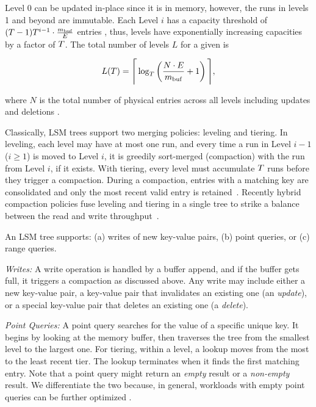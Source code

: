 Level 0 can be updated in-place since it is in memory, however, the runs in
levels 1 and beyond are immutable. Each Level $i$ has a capacity threshold of
$({{T}} - 1) T^{i-1} \cdot \frac{{{m_{\mathrm{buf}}}}}{E}$ entries , thus, levels have
exponentially increasing capacities by a factor of ${{T}}$.  The total
number of levels $L$ for a given {\sizeratio} is 

\begin{equation} 
L(T) = \Bigg\lceil \log_T \left( {\frac{N \cdot E}{{{m_{\mathrm{buf}}}}}} + 1 \right) \Bigg\rceil ,
\label{eq:levels}
\end{equation}

where $N$ is the total number of physical entries across all levels including
updates and deletions \cite{Dayan2018a, Luo2020, Sarkar2020}. 


Classically, LSM trees support two merging policies: leveling and tiering. 
In leveling, each level may have at most one run, and every time a run in Level
    $i - 1$ ($i \geq 1$) is moved to Level $i$, it is greedily sort-merged
    (compaction) with the run from Level $i$, if it exists. 
With tiering, every level must accumulate ${{T}}$ runs before they trigger
    a compaction. 
During a compaction, entries with a matching key are consolidated and only the
    most recent valid entry is retained~\cite{Dong2017, ONeil1996}. 
Recently hybrid compaction policies fuse leveling and tiering in a single tree
    to strike a balance between the read and write throughput~\cite{Dayan2018,
    Dayan2019}.


An LSM tree supports: (a) writes of new key-value pairs, (b) point queries, or
(c) range queries.

\emph{Writes:} A write operation is handled by a buffer append, and if the
buffer gets full, it triggers a compaction as discussed above. Any write may
include either a new key-value pair, a key-value pair that invalidates an
existing one (an \emph{update}), or a special key-value pair that deletes an
existing one (a \emph{delete}).


\emph{Point Queries:}
A point query searches for the value of a specific unique key. It begins by
looking at the memory buffer, then traverses the tree from the smallest level to
the largest one. For tiering, within a level, a lookup moves from the most to
the least recent tier. The lookup terminates when it finds the first matching
entry. Note that a point query might return an \emph{empty} result or a
\emph{non-empty} result. We differentiate the two because, in general, workloads
with empty point queries can be further optimized \cite{Dayan2017,Dayan2018a}.


